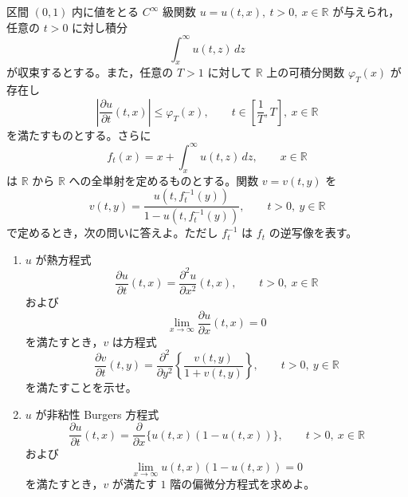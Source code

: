 \documentclass[12pt]{jlreq}
\newcommand{\R}{\mathbb{R}}
\begin{document}
区間 \((0,1)\) 内に値をとる \(C^\infty\) 級関数
\(u=u(t,x),\ t>0,\ x\in\R\) が与えられ，任意の \(t>0\) に対し積分
\[
  \int_x^\infty u(t,z)\,dz
\]
が収束するとする。また，任意の \(T>1\) に対して \(\R\) 上の可積分関数 \(\varphi_T(x)\) が存在し
\[
  \left|\frac{\partial u}{\partial t}(t,x)\right|\le \varphi_T(x),
  \qquad
  t\in\left[\frac1T,T\right],\ x\in\R
\]
を満たすものとする。さらに
\[
  f_t(x)=x+\int_x^\infty u(t,z)\,dz,\qquad x\in\R
\]
は \(\R\) から \(\R\) への全単射を定めるものとする。関数 \(v=v(t,y)\) を
\[
  v(t,y)=\frac{u(t,f_t^{-1}(y))}{1-u(t,f_t^{-1}(y))},
  \qquad t>0,\ y\in\R
\]
で定めるとき，次の問いに答えよ。ただし \(f_t^{-1}\) は \(f_t\) の逆写像を表す。

\begin{enumerate}
  \item \(u\) が熱方程式
  \[
    \frac{\partial u}{\partial t}(t,x)=\frac{\partial^2u}{\partial x^2}(t,x),
    \qquad t>0,\ x\in\R
  \]
  および
  \[
    \lim_{x\to\infty}\frac{\partial u}{\partial x}(t,x)=0
  \]
  を満たすとき，\(v\) は方程式
  \[
    \frac{\partial v}{\partial t}(t,y)
      =\frac{\partial^2}{\partial y^2}\left\{\frac{v(t,y)}{1+v(t,y)}\right\},
    \qquad t>0,\ y\in\R
  \]
  を満たすことを示せ。
  \item \(u\) が非粘性 Burgers 方程式
  \[
    \frac{\partial u}{\partial t}(t,x)
      =\frac{\partial}{\partial x}\{u(t,x)(1-u(t,x))\},
    \qquad t>0,\ x\in\R
  \]
  および
  \[
    \lim_{x\to\infty}u(t,x)(1-u(t,x))=0
  \]
  を満たすとき，\(v\) が満たす \(1\) 階の偏微分方程式を求めよ。
\end{enumerate}
\end{document}
